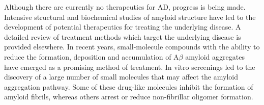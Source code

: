 

Although there are currently no therapeutics for AD, progress is being made. Intensive structural and biochemical studies of amyloid structure have led to the development of potential therapeutics for treating the underlying disease. A detailed review of treatment methods which target the underlying disease is provided elsewhere.\cite{Salomone:2012fh} In recent years, small-molecule compounds with the ability to reduce the formation, deposition and accumulation of A$\beta$ amyloid aggregates have emerged as a promising method of treatment. 
In vitro screenings led to the discovery of a large number of small molecules that may affect the amyloid aggregation pathway.\cite{Ryan:2012bh} Some of these drug-like molecules inhibit the formation of amyloid fibrils, whereas others arrest or reduce non-fibrillar oligomer formation.\cite{Necula:2007p5049,LeVine:2007jd} %

